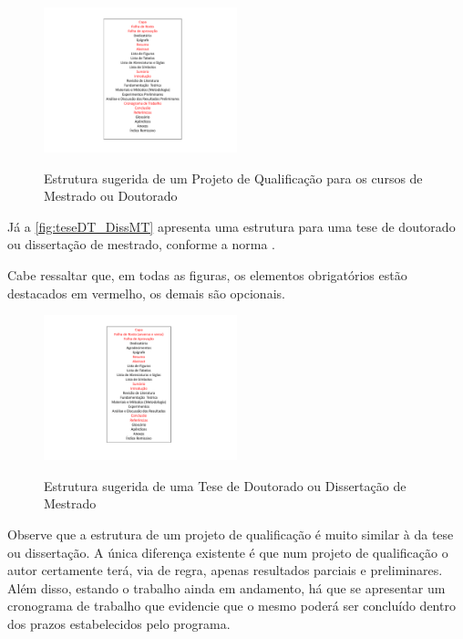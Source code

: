 \begin{apendicesenv}
\begin{figure}[!h]
	\centering
	\caption{Estrutura sugerida de um Projeto de Qualificação para os cursos de Mestrado ou Doutorado}
	\includegraphics[width=0.5\textwidth]{./04-figuras/prjQualif-TeseDT_DissMT}
	\label{fig:prjQualif-TeseDT_DissMT}
\end{figure}


Já a \autoref{fig:teseDT_DissMT} apresenta uma estrutura para uma tese de doutorado ou dissertação de mestrado, conforme a norma .

Cabe ressaltar que, em todas as figuras, os elementos obrigatórios estão destacados em vermelho, os demais são opcionais.


\begin{figure}[!h]
	\centering
	\caption{Estrutura sugerida de uma Tese de Doutorado ou Dissertação de Mestrado}
	\includegraphics[width=0.5\textwidth]{./04-figuras/teseDT_DissMT}
	\label{fig:teseDT_DissMT}
\end{figure}


Observe que a estrutura de um projeto de qualificação é muito similar à da tese ou dissertação. A única diferença existente é que num projeto de qualificação o autor certamente terá, via de regra, apenas resultados parciais e preliminares. Além disso, estando o trabalho ainda em andamento, há que se apresentar um cronograma de trabalho que evidencie que o mesmo poderá ser concluído dentro dos prazos estabelecidos pelo programa.



\end{apendicesenv}
